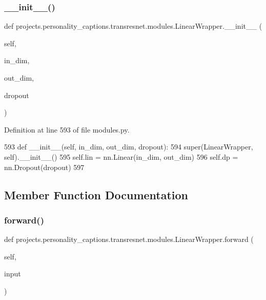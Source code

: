 \subsubsection{\texorpdfstring{\+\_\+\+\_\+init\+\_\+\+\_\+()}{\_\_init\_\_()}}
{\footnotesize\ttfamily def projects.\+personality\+\_\+captions.\+transresnet.\+modules.\+Linear\+Wrapper.\+\_\+\+\_\+init\+\_\+\+\_\+ (\begin{DoxyParamCaption}\item[{}]{self,  }\item[{}]{in\+\_\+dim,  }\item[{}]{out\+\_\+dim,  }\item[{}]{dropout }\end{DoxyParamCaption})}



Definition at line 593 of file modules.\+py.


\begin{DoxyCode}
593     \textcolor{keyword}{def }\_\_init\_\_(self, in\_dim, out\_dim, dropout):
594         super(LinearWrapper, self).\_\_init\_\_()
595         self.lin = nn.Linear(in\_dim, out\_dim)
596         self.dp = nn.Dropout(dropout)
597 
\end{DoxyCode}


\subsection{Member Function Documentation}
\mbox{\label{classprojects_1_1personality__captions_1_1transresnet_1_1modules_1_1LinearWrapper_a01b6a807a29f852bbd6109ce1f105f6b}} 
\subsubsection{\texorpdfstring{forward()}{forward()}}
{\footnotesize\ttfamily def projects.\+personality\+\_\+captions.\+transresnet.\+modules.\+Linear\+Wrapper.\+forward (\begin{DoxyParamCaption}\item[{}]{self,  }\item[{}]{input }\end{DoxyParamCaption})}

